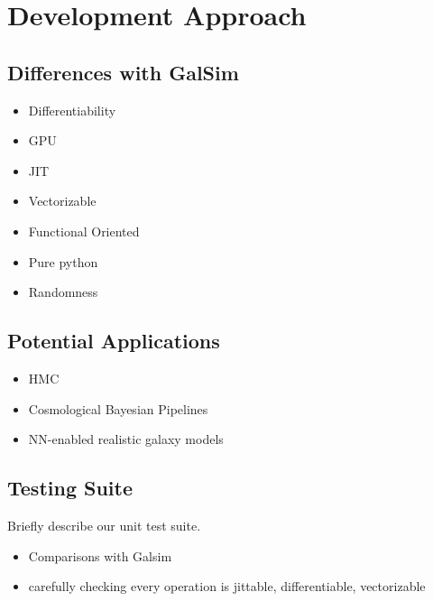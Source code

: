 \documentclass[twocolumn,twocolappendix]{openjournal}
\begin{document}
\section{Development Approach}

\subsection{Differences with GalSim}

\begin{itemize}
    \item Differentiability 
    \item GPU
    \item JIT 
    \item Vectorizable
    \item Functional Oriented
    \item Pure python
    \item Randomness
\end{itemize}

\subsection{Potential Applications}

\begin{itemize}
    \item HMC 
    \item Cosmological Bayesian Pipelines
    \item NN-enabled realistic galaxy models
\end{itemize}

\subsection{Testing Suite}

Briefly describe our unit test suite. 

\begin{itemize}
    \item Comparisons with Galsim
    \item carefully checking every operation is jittable, differentiable, vectorizable
\end{itemize}

\end{document}
